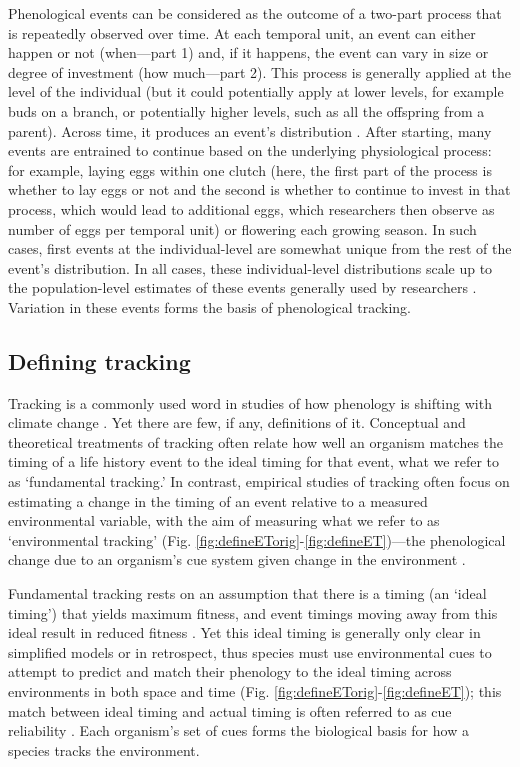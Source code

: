 \documentclass[11pt,letterpaper]{article}
\begin{document}
Phenological events can be considered as the outcome of a two-part process that is repeatedly observed over time. At each temporal unit, an event can either happen or not (when---part 1) and, if it happens, the event can vary in size or degree of investment (how much---part 2). This process is generally applied at the level of the individual (but it could potentially apply at lower levels, for example buds on a branch, or potentially higher levels, such as all the offspring from a parent). Across time, it produces an event's distribution \citep{gotelli1996,steer2019}. After starting, many events are entrained to continue based on the underlying physiological process: for example, laying eggs within one clutch (here, the first part of the process is whether to lay eggs or not and the second is whether to continue to invest in that process, which would lead to additional eggs, which researchers then observe as number of eggs per temporal unit) or flowering each growing season. In such cases, first events at the individual-level are somewhat unique from the rest of the event's distribution. In all cases, these individual-level distributions scale up to the population-level estimates of these events generally used by researchers \citep[see][for discussion of the outcomes of this scaling]{inouye2019}. Variation in these events forms the basis of phenological tracking. 

\subsection{Defining tracking}
Tracking is a commonly used word in studies of how phenology is shifting with climate change \citep[e.g.,][]{Menzel:2006xn,Parmesan:2006cr,Cleland:2012,deacy2018}. Yet there are few, if any, definitions of it. Conceptual and theoretical treatments of tracking often relate how well an organism matches the timing of a life history event to the ideal timing for that event, what we refer to as `fundamental tracking.' In contrast, empirical studies of tracking often focus on estimating a change in the timing of an event relative to a measured environmental variable, with the aim of measuring what we refer to as `environmental tracking' (Fig. \ref{fig:defineETorig}-\ref{fig:defineET})---the phenological change due to an organism's cue system given change in the environment \citep[though most studies lack the required knowledge of the underlying cue system,][]{chmura2019}. 

Fundamental tracking rests on an assumption that there is a timing (an `ideal timing') that yields maximum fitness, and event timings moving away from this ideal result in reduced fitness \citep[a foundational concept of the trophic mismatch literature,][]{vissergienapp2019}. Yet this ideal timing is generally only clear in simplified models or in retrospect, thus species must use environmental cues to attempt to predict and match their phenology to the ideal timing across environments in both space and time (Fig. \ref{fig:defineETorig}-\ref{fig:defineET}); this match between ideal timing and actual timing is often referred to as cue reliability \citep{donald2013,bonamour2019}. Each organism's set of cues forms the biological basis for how a species tracks the environment.
\end{document}
